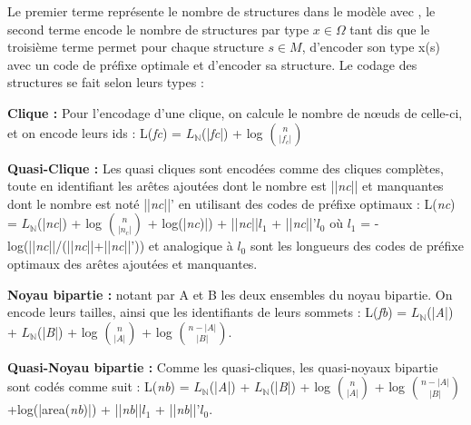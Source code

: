 Le premier terme représente le nombre de structures dans le modèle avec %
, le second terme encode le nombre de structures par type $x \in \Omega$ tant dis que le troisième terme permet  pour chaque structure $s \in \textit{M}$, d'encoder son type x(s) avec un code de préfixe optimale et d'encoder sa structure. Le codage des structures se fait selon leurs types :

\textbf{Clique :} Pour l'encodage d'une clique, on calcule le nombre de nœuds de celle-ci, et on encode leurs ids :
L(\textit{fc}) = $L_{\mathbb{N}}$(|\textit{fc}|) + log ${n}\choose{|f_{c}|}$

\textbf{Quasi-Clique :} Les quasi cliques sont encodées comme des cliques complètes, toute en identifiant les arêtes ajoutées dont le nombre est ||\textit{nc}|| et manquantes dont le nombre est noté ||\textit{nc}||' en utilisant des codes de préfixe optimaux : 
L(\textit{nc}) = $L_{\mathbb{N}}$(|\textit{nc}|) + log ${n}\choose{|n_{c}|}$ + log(|\textit{nc})|) + ||\textit{nc}||\textit{$l_{1}$} +  ||\textit{nc}||'\textit{$l_{0}$}
où \textit{$l_{1}$} = - log(||\textit{nc}||/(||\textit{nc}||+||\textit{nc}||')) et analogique à \textit{$l_{0}$} sont les longueurs des codes de préfixe optimaux des arêtes  ajoutées et manquantes.

\textbf{Noyau bipartie :} notant par A et B les deux ensembles du noyau bipartie. On encode leurs tailles, ainsi que les identifiants de leurs sommets : 
L(\textit{fb}) = $L_{\mathbb{N}}$(|\textit{A}|) + $L_{\mathbb{N}}$(|\textit{B}|) + log ${n}\choose{|A|}$ + log ${n-|A|}\choose{|B|}$.

\textbf{Quasi-Noyau bipartie :} Comme les quasi-cliques, les quasi-noyaux bipartie sont codés comme suit :
L(\textit{nb}) = $L_{\mathbb{N}}$(|\textit{A}|) + $L_{\mathbb{N}}$(|\textit{B}|) + log ${n}\choose{|A|}$  + log ${n-|A|}\choose{|B|}$+log(|area(\textit{nb})|) + ||\textit{nb}||\textit{$l_{1}$} + ||\textit{nb}||'\textit{$l_{0}$}.

